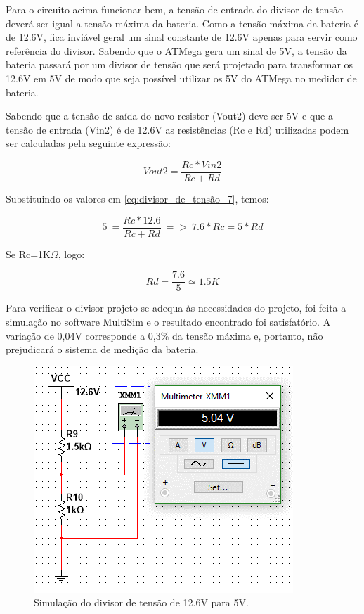 		Para o circuito acima funcionar bem, a tensão de entrada do divisor de tensão deverá ser igual a tensão máxima da bateria. Como a tensão máxima da bateria é de 12.6V, fica inviável geral um sinal constante de 12.6V apenas para servir como referência do divisor. Sabendo que o ATMega gera um sinal de 5V, a tensão da bateria passará por um divisor de tensão  que será projetado para transformar os 12.6V em 5V de modo que seja possível utilizar os 5V do ATMega no medidor de bateria.

		Sabendo que a tensão de saída do novo resistor (Vout2) deve ser 5V e que a tensão de entrada (Vin2) é de 12.6V as resistências (Rc e Rd) utilizadas podem ser calculadas pela seguinte expressão:

		\begin{equation}
		\label{eq:divisor_de_tensão_7}
			Vout2 =\frac{Rc * Vin2}{Rc + Rd}
		\end{equation}

		Substituindo os valores em \ref{eq:divisor_de_tensão_7}, temos:

		\begin{equation}
		\label{eq:divisor_de_tensão_8}
			5\ =\frac{Rc * 12.6}{Rc + Rd}\ =>\ 7.6 * Rc = 5 *Rd
		\end{equation}

		Se Rc=1K$\Omega$, logo:

		\begin{equation}
		\label{eq:divisor_de_tensão_9}
			Rd =\frac{7.6}{5} \simeq 1.5K
		\end{equation}

		Para verificar o divisor projeto se adequa às necessidades do projeto, foi feita a simulação no software MultiSim e o resultado encontrado foi satisfatório. A variação de 0,04V corresponde a 0,3\% da tensão máxima e, portanto, não prejudicará o sistema de medição da bateria.

		\begin{figure}[H]
			\centering
			\includegraphics[scale=0.8]{figuras/Divisor2_simu.png}
			\caption{Simulação do divisor de tensão de 12.6V para 5V.}
			\label{img:divisor_de_tesnão_simulado}
		\end{figure}

